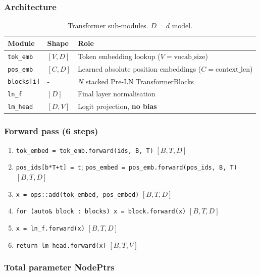 \documentclass[12pt, a4paper]{article}
\begin{document}
\subsubsection{Architecture}

\begin{table}[!ht]
\centering
\renewcommand{\arraystretch}{1.3}
\begin{tabularx}{\textwidth}{@{} l l L @{}}
\toprule
Module & Shape & Role \\
\midrule
\texttt{tok\_emb}  & \([V, D]\)    & Token embedding lookup (\(V\!=\!\text{vocab\_size}\)) \\
\texttt{pos\_emb}  & \([C, D]\)    & Learned absolute position embeddings (\(C\!=\!\text{context\_len}\)) \\
\texttt{blocks[i]} & - & \(N\) stacked Pre-LN TransformerBlocks \\
\texttt{ln\_f}     & \([D]\)       & Final layer normalisation \\
\texttt{lm\_head}  & \([D, V]\)    & Logit projection, \textbf{no bias} \\
\bottomrule
\end{tabularx}
\caption{Transformer sub-modules.  \(D = d\_\text{model}\).}
\end{table}

\subsubsection{Forward pass (6 steps)}

\begin{enumerate}
  \item \lstinline{tok_embed = tok_emb.forward(ids, B, T)}  \hfill \([B,T,D]\)
  \item \lstinline{pos_ids[b*T+t] = t}; \lstinline{pos_embed = pos_emb.forward(pos_ids, B, T)}  \hfill \([B,T,D]\)
  \item \lstinline{x = ops::add(tok_embed, pos_embed)}  \hfill \([B,T,D]\)
  \item \lstinline{for (auto& block : blocks) x = block.forward(x)}  \hfill \([B,T,D]\)
  \item \lstinline{x = ln_f.forward(x)}  \hfill \([B,T,D]\)
  \item \lstinline{return lm_head.forward(x)}  \hfill \([B,T,V]\)
\end{enumerate}

\subsubsection{Total parameter NodePtrs}
\end{document}
